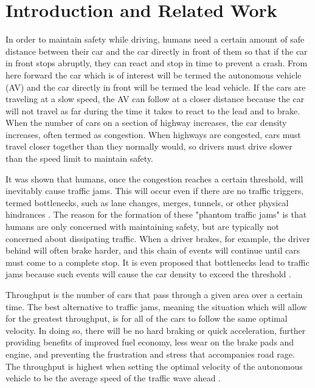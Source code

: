 \documentclass[conference]{IEEEtran}
\begin{document}







\section{Introduction and Related Work}
In order to maintain safety while driving, humans need a certain amount of safe distance between their car and the car directly in front of them so that if the car in front stops abruptly, they can react and stop in time to prevent a crash. From here forward the car which is of interest will be termed the autonomous vehicle (AV) and the car directly in front will be termed the lead vehicle. If the cars are traveling at a slow speed, the AV can follow at a closer distance because the car will not travel as far during the time it takes to react to the lead and to brake.
When the number of cars on a section of highway increases, the car density increases, often termed as congestion. When highways are congested, cars must travel closer together than they normally would, so drivers must drive slower than the speed limit to maintain safety.

It was shown that humans, once the congestion reaches a certain threshold, will inevitably cause traffic jams. This will occur even if there are no traffic triggers, termed bottlenecks, such as lane changes, merges, tunnels, or other physical hindrances \cite{Sugiyama}. The reason for the formation of these "phantom traffic jams" is that humans are only concerned with maintaining safety, but are typically not concerned about dissipating traffic. When a driver brakes, for example, the driver behind will often brake harder, and this chain of events will continue until cars must come to a complete stop. It is even proposed that bottlenecks lead to traffic jams because such events will cause the car density to exceed the threshold \cite{Sugiyama}.

Throughput is the number of cars that pass through a given area over a certain time. The best alternative to traffic jams, meaning the situation which will allow for the greatest throughput, is for all of the cars to follow the same optimal velocity. In doing so, there will be no hard braking or quick acceleration, further providing benefits of improved fuel economy, less wear on the brake pads and engine, and preventing the frustration and stress that accompanies road rage. The throughput is highest when setting the optimal velocity of the autonomous vehicle to be the average speed of the traffic wave ahead \cite{Stern}.
\end{document}

